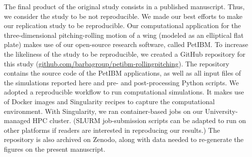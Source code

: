 The final product of the original study consists in a published manuscript.
Thus, we consider the study to be not reproducible.
We made our best efforts to make our replication study to be reproducible.
Our computational application for the three-dimensional pitching-rolling motion of a wing (modeled as an elliptical flat plate) makes use of our open-source research software, called PetIBM.\cite{chuang_et_al_2018}
To increase the likeliness of the study to be reproducible, we created a GitHub repository for this study (\url{github.com/barbagroup/petibm-rollingpitching}).
The repository contains the source code of the PetIBM applications, as well as all input files of the simulations reported here and pre- and post-processing Python scripts.
We adopted a reproducible workflow to run computational simulations.
It makes use of Docker images and Singularity recipes to capture the computational environment.
With Singularity, we ran container-based jobs on our University-managed HPC cluster.
(SLURM job-submission scripts can be adapted to run on other platforms if readers are interested in reproducing our results.)
The repository is also archived on Zenodo, along with data needed to re-generate the figures on the present manuscript.

